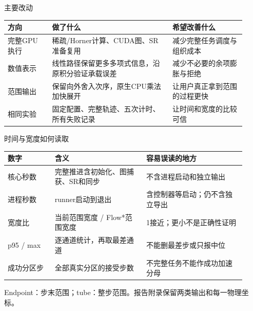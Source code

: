\documentclass[UTF8,fontset=fandol,aspectratio=169,10pt]{ctexbeamer}
\begin{document}
\begin{frame}{主要改动}
{\fontsize{8.5}{11}\selectfont
{\setlength{\tabcolsep}{2pt}\renewcommand{\arraystretch}{1.25}
\begin{tabular}{>{\raggedright\arraybackslash}p{0.175\linewidth}>{\raggedright\arraybackslash}p{0.460\linewidth}>{\raggedright\arraybackslash}p{0.285\linewidth}}
\toprule
\textbf{方向} & \textbf{做了什么} & \textbf{希望改善什么} \\
\midrule
完整GPU执行 & 稀疏/\allowbreak{}Horner计算、CUDA图、SR准备复用 & 减少完整任务调度与组织成本 \\
数值表示 & 线性路径保留更多多项式信息，沿原积分验证承载误差 & 减少不必要的余项膨胀与拒绝 \\
范围输出 & 保留向外舍入次序，原生CPU乘法加快展开 & 让用户真正拿到范围的过程更快 \\
相同实验 & 固定配置、完整轨迹、五次计时、所有失败记录 & 让时间和宽度的比较可信 \\
\bottomrule
\end{tabular}
}
}\par

\end{frame}
\begin{frame}{时间与宽度如何读取}
{\fontsize{8.5}{11}\selectfont
{\setlength{\tabcolsep}{2pt}\renewcommand{\arraystretch}{1.25}
\begin{tabular}{>{\raggedright\arraybackslash}p{0.184\linewidth}>{\raggedright\arraybackslash}p{0.350\linewidth}>{\raggedright\arraybackslash}p{0.386\linewidth}}
\toprule
\textbf{数字} & \textbf{含义} & \textbf{容易误读的地方} \\
\midrule
核心秒数 & 完整推进含初始化、图捕获、SR和同步 & 不含进程启动和独立输出 \\
进程秒数 & runner启动到退出 & 含控制器等启动；仍不含独立导出 \\
宽度比 & 当前范围宽度 /\allowbreak{} Flow*范围宽度 & 1接近；更小不是正确性证明 \\
p95 /\allowbreak{} max & 逐通道统计，再取最差通道 & 不能删最差步或只报中位 \\
成功分区步 & 全部真实分区的接受步数 & 不完整任务不能作成功加速分母 \\
\bottomrule
\end{tabular}
}
}\par
\par\vfill{\fontsize{6.5}{8}\selectfont\color{gray}Endpoint：步末范围；tube：整步范围。报告附录保留两类输出和每一物理坐标。} 
\end{frame}
\end{document}

